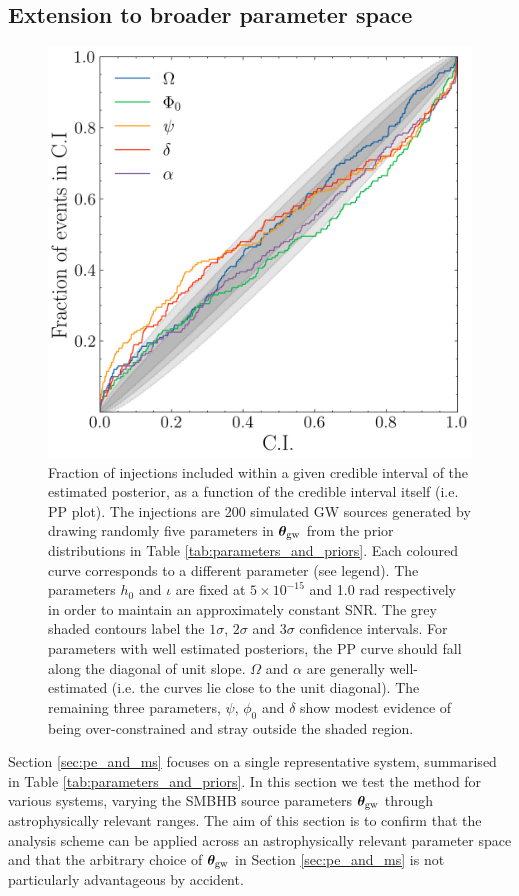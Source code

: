 \documentclass[fleqn,usenatbib,useAMS]{mnras}
\begin{document}
\subsection{Extension to broader parameter space} \label{sec:parameter_space}
\begin{figure}
	\centering
	\includegraphics[width=\columnwidth]{images/pp_plot_canonical500}
	\caption{Fraction of injections included within a given credible interval of the estimated posterior, as a function of the credible interval itself (i.e. PP plot). The injections are 200 simulated GW sources generated by drawing randomly five parameters in $\boldsymbol{\theta}_{\rm gw}$ from the prior distributions in Table \ref{tab:parameters_and_priors}. Each coloured curve corresponds to a different parameter (see legend). The parameters $h_0$ and $\iota$ are fixed at $5 \times 10^{-15}$ and 1.0 rad respectively in order to maintain an approximately constant SNR. The grey shaded contours label the $1\sigma$, $2\sigma$ and 3$\sigma$ confidence intervals. For parameters with well estimated posteriors, the PP curve should fall along the diagonal of unit slope. $\Omega$ and $\alpha$ are generally well-estimated (i.e. the curves lie close to the unit diagonal). The remaining three parameters, $\psi$, $\phi_0$ and $\delta$ show modest evidence of being over-constrained and stray outside the shaded region.}
	\label{fig:parameter_space}
\end{figure}
Section \ref{sec:pe_and_ms} focuses on a single representative system, summarised in Table \ref{tab:parameters_and_priors}. In this section we test the method for various systems, varying the SMBHB source parameters $\boldsymbol{\theta}_{\rm gw}$ through astrophysically relevant ranges. The aim of this section is to confirm that the analysis scheme can be applied across an astrophysically relevant parameter space and that the arbitrary choice of $\boldsymbol{\theta}_{\rm gw}$ in Section \ref{sec:pe_and_ms} is not particularly advantageous by accident. \newline 
\end{document}
